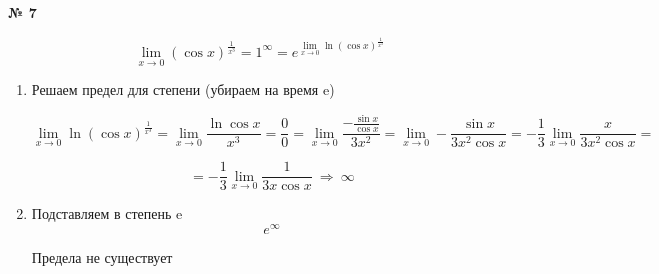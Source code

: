 \documentclass{article}
\begin{document}
\textbf{№ 7} 
\large

$$ \lim\limits_{x \to 0} \left( \cos{x} \right)^{\frac{1}{x^3}} 
= 1^{\infty}
= e^{\lim\limits_{x \to 0} \ln{\left( \cos{x} \right)}^{\frac{1}{x^3}} } $$  

\begin{enumerate}
\item Решаем предел для степени (убираем на время e)

$$ \lim\limits_{x \to 0} \ln{\left( \cos{x} \right)}^{\frac{1}{x^3}} 
= \lim\limits_{x \to 0} \frac{\ln{\cos{x}}}{x^3}
= \frac{0}{0}
= \lim\limits_{x \to 0} \frac{-\frac{\sin{x}}{\cos{x}}}{3x^2} 
= \lim\limits_{x \to 0} - \frac{\sin{x}}{3x^2 \cos{x}} 
= -\frac{1}{3} \lim\limits_{x \to 0} \frac{x}{3x^2 \cos{x}} 
= $$
  
$$ = -\frac{1}{3} \lim\limits_{x \to 0} \frac{1}{3x \cos{x}}
\
\Rightarrow
\
\infty $$  
    
\item Подставляем в степень e
$$ e^{\infty} $$

Предела не существует
    
\end{enumerate}
\end{document}
